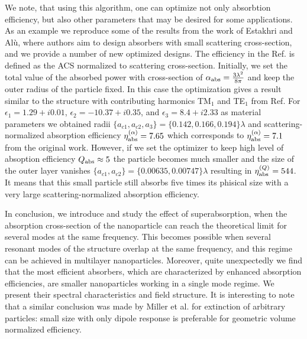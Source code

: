 \documentclass[twoside,twocolumn,9pt]{article}
\begin{document}
We note, that using this algorithm, one can optimize not
only absorbtion efficiency, but also other parameters that may be
desired for some applications. As an example we reproduce some of the
results from the work of Estakhri and Al\`u,\cite{Alu-2014} where
authors aim to design absorbers with small scattering cross-section,
and we provide a number of new optimized designs. The efficiency in
the Ref.\cite{Alu-2014} is defined as the ACS normalized to
scattering cross-section. Initially, we set the total value of the
absorbed power with cross-section of $\alpha_{\rm
  abs}=\frac{3\lambda^2}{8\pi}$ and keep the outer radius of the
particle fixed. In this case the optimization gives a result similar
to the structure with contributing harmonics TM${_1}$ and TE$_1$ from
Ref.\cite{Alu-2014}  For $\epsilon_1 = 1.29+i0.01$, $\epsilon_2 =
-10.37+ i0.35$, and $\epsilon_3=8.4+i2.33$ as material parameters we
obtained radii $\{a_{c1},a_{c2},a_3\}=\{0.142,0.166,0.194\}\lambda$
and scattering-normalized absorption efficiency $\eta_{\rm
  abs}^{(\alpha)} =7.65$ which corresponds to $\eta_{\rm
  abs}^{(\alpha)} =7.1$ from the original work.\cite{Alu-2014}
However, if we set the optimizer to keep high level of absoption
efficiency $Q_{\rm abs} \approx 5$ the particle becomes much smaller
and the size of the outer layer vanishes
$\{a_{c1},a_{c2}\}=\{0.00635,0.00747\}\lambda$ resulting in $\eta_{\rm
  abs}^{(Q)} =544$.  It means that this small particle still absorbs
five times its phisical size with a very large scattering-normalized
absorption efficiency.



In conclusion, we introduce and study the effect of superabsorption,
when the absorption cross-section of the nanoparticle can reach the
theoretical limit for several modes at the same frequency. This
becomes possible when several resonant modes of the structure overlap
at the same frequency, and this regime can be achieved in multilayer
nanoparticles. Moreover, quite unexpectedly we find that the most
efficient absorbers, which are characterized by enhanced absorption
efficiencies, are smaller nanoparticles working in a single mode
regime. We present their spectral characteristics and field structure.
It is interesting to note that a similar conclusion was made by Miller
et al.\cite{Miller-2014} for extinction of arbitrary particles: small
size with only dipole response is preferable for geometric volume
normalized efficiency.
\end{document}
